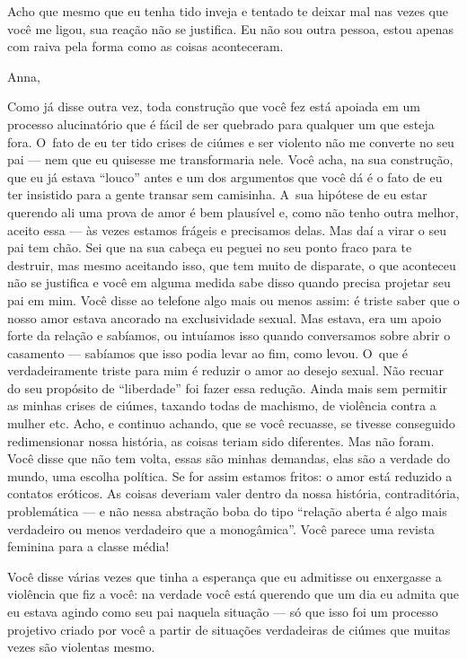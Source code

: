Acho que mesmo que eu tenha tido inveja e tentado te deixar mal nas
vezes que você me ligou, sua reação não se justifica. Eu não sou outra
pessoa, estou apenas com raiva pela forma como as coisas aconteceram.

\asterisc{}

Anna,

\medskip{} 

Como já disse outra vez, toda construção que você fez está apoiada em um
processo alucinatório que é fácil de ser quebrado para qualquer um que
esteja fora. O~fato de eu ter tido crises de ciúmes e ser violento não
me converte no seu pai --- nem que eu quisesse me transformaria nele.
Você acha, na sua construção, que eu já estava ``louco'' antes e um dos
argumentos que você dá é o fato de eu ter insistido para a gente transar
sem camisinha. A~sua hipótese de eu estar querendo ali uma prova de amor
é bem plausível e, como não tenho outra melhor, aceito essa --- às vezes
estamos frágeis e precisamos delas. Mas daí a virar o seu pai tem chão.
Sei que na sua cabeça eu peguei no seu ponto fraco para te destruir, mas
mesmo aceitando isso, que tem muito de disparate, o que aconteceu não se
justifica e você em alguma medida sabe disso quando precisa projetar seu
pai em mim. Você disse ao telefone algo mais ou menos assim: é triste
saber que o nosso amor estava ancorado na exclusividade sexual. Mas
estava, era um apoio forte da relação e sabíamos, ou intuíamos isso
quando conversamos sobre abrir o casamento --- sabíamos que isso podia
levar ao fim, como levou. O~que é verdadeiramente triste para mim é
reduzir o amor ao desejo sexual. Não recuar do seu propósito de
``liberdade'' foi fazer essa redução. Ainda mais sem permitir as minhas
crises de ciúmes, taxando todas de machismo, de violência contra a
mulher etc. Acho, e continuo achando, que se você recuasse, se tivesse
conseguido redimensionar nossa história, as coisas teriam sido
diferentes. Mas não foram. Você disse que não tem volta, essas são
minhas demandas, elas são a verdade do mundo, uma escolha política. Se
for assim estamos fritos: o amor está reduzido a contatos eróticos. As
coisas deveriam valer dentro da nossa história, contraditória,
problemática --- e não nessa abstração boba do tipo ``relação aberta é
algo mais verdadeiro ou menos verdadeiro que a monogâmica''. Você parece
uma revista feminina para a classe média!

Você disse várias vezes que tinha a esperança que eu admitisse ou
enxergasse a violência que fiz a você: na verdade você está querendo que
um dia eu admita que eu estava agindo como seu pai naquela situação ---
só que isso foi um processo projetivo criado por você a partir de
situações verdadeiras de ciúmes que muitas vezes são violentas mesmo.

